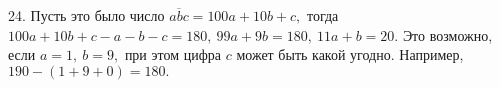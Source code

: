 24. Пусть это было число $\overline{abc}=100a+10b+c,$ тогда $100a+10b+c-a-b-c=180,\ 99a+9b=180,\ 11a+b=20.$ Это возможно, если $a=1,\ b=9,$ при этом цифра $c$ может быть какой угодно. Например, $190-(1+9+0)=180.$\\
